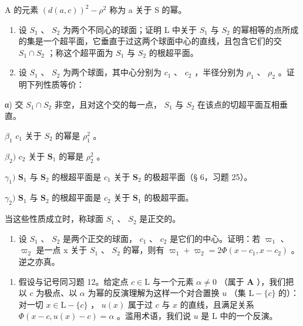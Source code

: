 A 的元素 \((d(a, c))^{2} - \rho^{2}\) 称为 a 关于 S 的幂。

\begin{enumerate}
\def\labelenumi{\alph{enumi})}
\setcounter{enumi}{2}
\item
  设 \(S_{1}\) 、 \(S_{2}\) 为两个不同心的球面；证明 L 中关于 \(S_{1}\) 与 \(S_{2}\) 的幂相等的点所成的集是一个超平面，它垂直于过这两个球面中心的直线，且包含它们的交 \(S_{1} \cap S_{2}\) ；称这个超平面为 \(S_{1}\) 与 \(S_{2}\) 的根超平面。
\item
  设 \(S_{1}\) 、 \(S_{2}\) 为两个球面，其中心分别为 \(c_{1}\) 、 \(c_{2}\) ，半径分别为 \(\rho_{1}\) 、 \(\rho_{2}\) 。证明下列性质等价：
\end{enumerate}

α) 交 \(S_{1} \cap S_{2}\) 非空，且对这个交的每一点， \(S_{1}\) 与 \(S_{2}\) 在该点的切超平面互相垂直。

\(\beta_{1}\) \(c_{1}\) 关于 \(S_{2}\) 的幂是 \(\rho_{1}^{2}\) 。

\(\beta_{2})\) \(c_{2}\) 关于 \(\mathbf{S}_{1}\) 的幂是 \(\rho_{2}^{2}\) 。

\(\gamma_{1})\) \(\mathbf{S}_{1}\) 与 \(\mathbf{S}_{2}\) 的根超平面是 \(c_{1}\) 关于 \(\mathbf{S}_{2}\) 的极超平面（§ 6，习题 25）。

\(\gamma_{2})\) \(\mathbf{S}_{1}\) 与 \(\mathbf{S}_{2}\) 的根超平面是 \(c_{2}\) 关于 \(\mathbf{S}_{1}\) 的极超平面。

当这些性质成立时，称球面 \(S_{1}\) 、 \(S_{2}\) 是正交的。

\begin{enumerate}
\def\labelenumi{\alph{enumi})}
\setcounter{enumi}{4}
\tightlist
\item
  设 \(S_{1}\) 、 \(S_{2}\) 是两个正交的球面， \(c_{1}\) 、 \(c_{2}\) 是它们的中心。证明：若 \(\varpi_{1}\) 、 \(\varpi_{2}\) 是一点 x 关于 \(S_{1}\) 、 \(S_{2}\) 的幂，则有 \(\varpi_{1} + \varpi_{2} = 2\Phi(x - c_{1}, x - c_{2})\) 。逆之亦真。
\end{enumerate}

\begin{enumerate}
\def\labelenumi{\arabic{enumi})}
\setcounter{enumi}{12}
\tightlist
\item
  假设与记号同习题 12。给定点 \(c \in \mathrm{L}\) 与一个元素 \(\alpha \neq 0\) （属于 \(\mathbf{A}\) ），我们把以 \(c\) 为极点、以 \(\alpha\) 为幂的反演理解为这样一个对合置换 \(u\) （集 \(\mathrm{L} - \{c\}\) 的）：对一切 \(x \in \mathrm{L} - \{c\}\) ， \(u(x)\) 属于过 \(c\) 与 \(x\) 的直线，且满足关系 \(\Phi(x - c, u(x) - c) = \alpha\) 。滥用术语，我们说 \(u\) 是 \(\mathrm{L}\) 中的一个反演。
\end{enumerate}

